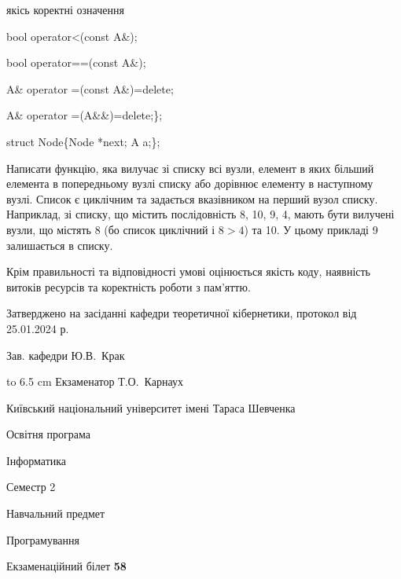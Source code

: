 \documentclass[12pt, ukrainian]{article}
\begin{document}
{\quad  якісь коректні означення 

\quad  bool operator<(const A\&); 

\quad  bool operator==(const A\&); 

\quad A\& operator =(const A\&)=delete; 

\quad  A\& operator =(A\&\&)=delete;\};

struct Node\{Node *next; A a;\};

 Написати функцію, яка вилучає зі списку всі вузли, елемент в яких більший елемента в попередньому вузлі списку або дорівнює елементу в наступному вузлі. Список є циклічним та задається вказівником на перший вузол списку. Наприклад, зі списку, що містить послідовність 8, 10, 9, 4, мають бути вилучені вузли, що містять 8 (бо список циклічний і $8>4$) та 10. У цьому прикладі 9 залишається в списку.

Крім правильності та відповідності умові оцінюється якість коду, наявність витоків ресурсів та коректність роботи з пам'яттю. 

}
{\smallskip\smallskip \begin {scriptsize} Затверджено на засіданні кафедри теоретичної кібернетики, протокол   від   25.01.2024 р.\par\smallskip\smallskip\smallskip\smallskip
{\parbox {6.5 cm} {Зав. кафедри \dotfill Ю.В.~Крак}}\hspace {0.7cm} {\hbox to 6.5 cm { Екзаменатор \dotfill Т.О.~Карнаух}} \end{scriptsize}}
\newpage
{{\begin {scriptsize}\par
{ \center  Київський національний університет імені Тараса Шевченка \par}
{\parbox {5 cm}{Освітня програма \hfill}{\parbox {7 cm}{Інформатика\hfill}}\parbox {6 cm}{\hfill Семестр 2}}\par
{\parbox {5 cm} {Навчальний предмет \hfill}\parbox {7 cm}{Програмування \hfill}\parbox {6cm}{\hfill}\par}\vspace{-15pt} \end{scriptsize}}{\center Екзаменаційний білет \No \textbf { 58 }\par}}
\end{document}
